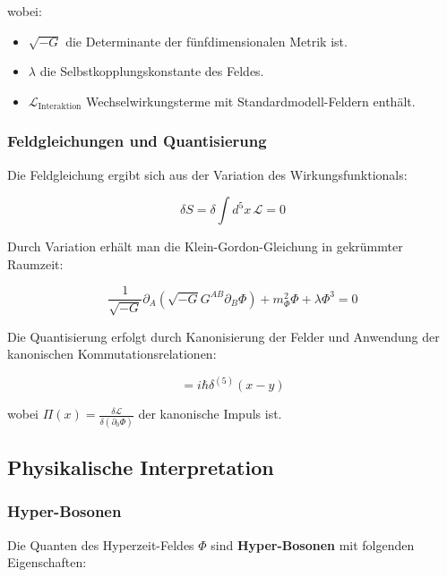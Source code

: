 \documentclass[11pt,a4paper]{article}
\begin{document}
wobei:

\begin{itemize}
    \item $\sqrt{-G}$ die Determinante der fünfdimensionalen Metrik ist.
    \item $\lambda$ die Selbstkopplungskonstante des Feldes.
    \item $\mathcal{L}_{\text{Interaktion}}$ Wechselwirkungsterme mit Standardmodell-Feldern enthält.
\end{itemize}

\subsubsection{Feldgleichungen und Quantisierung}

Die Feldgleichung ergibt sich aus der Variation des Wirkungsfunktionals:

\begin{equation}
\delta S = \delta \int d^5 x \, \mathcal{L} = 0
\end{equation}

Durch Variation erhält man die Klein-Gordon-Gleichung in gekrümmter Raumzeit:

\begin{equation}
\frac{1}{\sqrt{-G}} \partial_A \left( \sqrt{-G} G^{AB} \partial_B \Phi \right) + m_\Phi^2 \Phi + \lambda \Phi^3 = 0
\end{equation}

Die Quantisierung erfolgt durch Kanonisierung der Felder und Anwendung der kanonischen Kommutationsrelationen:

\begin{equation}
[\Phi(x), \Pi(y)] = i \hbar \delta^{(5)}(x - y)
\end{equation}

wobei $\Pi(x) = \frac{\delta \mathcal{L}}{\delta (\partial_0 \Phi)}$ der kanonische Impuls ist.

\subsection{Physikalische Interpretation}

\subsubsection{Hyper-Bosonen}

Die Quanten des Hyperzeit-Feldes $\Phi$ sind \textbf{Hyper-Bosonen} mit folgenden Eigenschaften:
\end{document}
